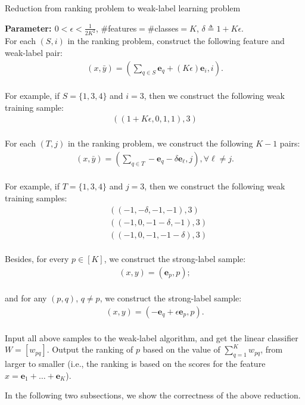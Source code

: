 \documentclass{article}
\newcommand{\e}{\mathbf{e}}
\begin{document}
\begin{algorithm}[H]
\caption{Reduction from ranking problem to weak-label learning problem}
\textbf{Parameter: $0 < \epsilon < \frac{1}{2K^2}$}, $\#$features$=\#$classes$=K$, $\delta\triangleq 1+K\epsilon$. \\
For each $(S,i)$ in the ranking problem, construct the following feature and weak-label pair: 
\begin{align}
    (x,\bar{y}) = \left( \sum_{q\in S} \e_q + (K\epsilon) \e_i , i\right). \label{feat1}
\end{align}\\
For example, if $S=\{1,3,4\}$ and $i=3$, then we construct the following weak training sample: 
\begin{align*}
    ((1+ K\epsilon, 0, 1,1), 3)
\end{align*}\\

For each $(T,j)$ in the ranking problem, we construct the following $K-1$ pairs: 
\begin{align}
    (x,\bar{y}) = \left( \sum_{q\in T} -\e_q - \delta \e_\ell , j\right), \forall \ell\neq j. \label{feat2}
\end{align}\\
For example, if $T=\{1,3,4\}$ and $j=3$, then we construct the following weak training samples: 
\begin{align*}
    &((-1, -\delta, -1,-1), 3)\\
    &((-1, 0, -1-\delta, -1), 3)\\
    &((-1,0,-1,-1-\delta), 3)
\end{align*}\\


Besides, for every $p\in [K]$, we construct the strong-label sample: 
\begin{align}
    (x,y) = (\e_p, p); \label{feat3}
\end{align}\\


and for any $(p,q)$, $q\neq p$, we construct the strong-label sample: \begin{align}
    (x,y) = (-\e_q + \epsilon \e_p, p). \label{feat4}
\end{align}\\
Input all above samples to the weak-label algorithm, and get the linear classifier $W=[w_{pq}]$. Output the ranking of $p$ based on the value of $\sum_{q=1}^{K} w_{pq}$, from larger to smaller (i.e., the ranking is based on the scores for the feature $x=\e_1+\ldots+\e_K$). 
\end{algorithm}
In the following two subsections, we show the correctness of the above reduction. 
\end{document}
